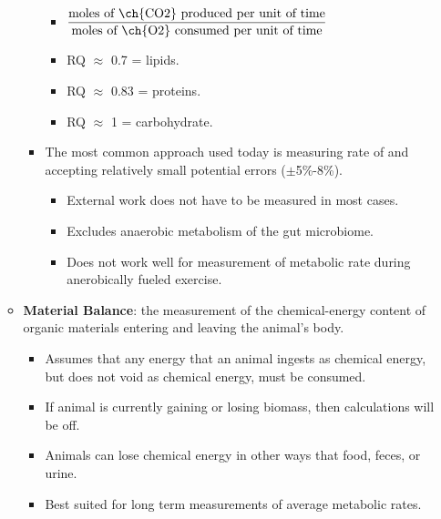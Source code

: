 \documentclass[12pt,a4paper]{article}
\begin{document}
\begin{itemize}
\begin{itemize}
\begin{itemize}
                    \begin{itemize}
                        \item $\dfrac{\text{moles of \ch{CO2} produced per unit of time}}{\text{moles of \ch{O2} consumed per unit of time}}$
                        \item RQ \(\approx\) 0.7 = lipids.
                        \item RQ \(\approx\) 0.83 = proteins. 
                        \item RQ \(\approx\) 1 = carbohydrate.
                     \end{itemize}
                \item The most common approach used today is measuring rate of  and accepting relatively small potential errors (\(\pm\)5\%-8\%).
                     \begin{itemize}
                         \item External work does not have to be measured in most cases.
                         \item Excludes anaerobic metabolism of the gut microbiome.
                         \item Does not work well for measurement of metabolic rate during anerobically fueled exercise.
                     \end{itemize}
            \end{itemize}
        \item \textbf{Material Balance}: the measurement of the chemical-energy content of organic materials entering and leaving the animal's body.
            \begin{itemize}
                \item Assumes that any energy that an animal ingests as chemical energy, but does not void as chemical energy,  must be consumed.
                \item If animal is currently gaining or losing biomass, then calculations will be off.
                \item Animals can lose chemical energy in other ways that food, feces, or urine.
                \item Best suited for {\color{o-Sun}long term} measurements of average metabolic rates.
            \end{itemize}
    \end{itemize}

\end{itemize}
\end{document}
